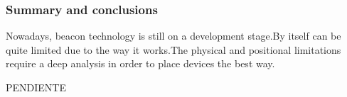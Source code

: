 \begin{frame} [fragile]
	\frametitle{Summary and conclusions}
		Nowadays, beacon technology is still on a development stage.By itself can be quite limited due to the way it works.The physical and positional limitations require a deep analysis in order to place devices the best way.
		
		\bigskip
		PENDIENTE
	\endblock{}
\end{frame}
